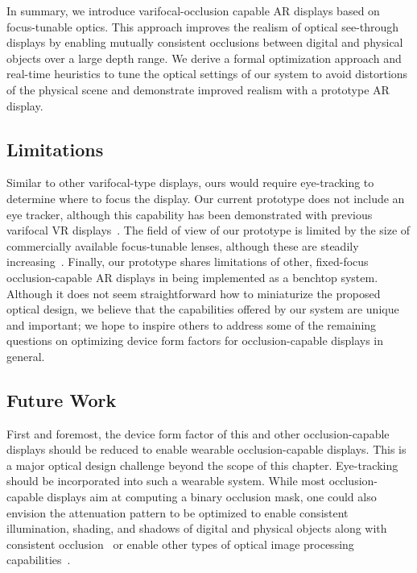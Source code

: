 In summary, we introduce varifocal-occlusion capable AR displays based on focus-tunable optics. This approach improves the realism of optical see-through displays by enabling mutually consistent occlusions between digital and physical objects over a large depth range. We derive a formal optimization approach and real-time heuristics to tune the optical settings of our system to avoid distortions of the physical scene and demonstrate improved realism with a prototype AR display. 

\subsection{Limitations}

Similar to other varifocal-type displays, ours would require eye-tracking to determine where to focus the display. Our current prototype does not include an eye tracker, although this capability has been demonstrated with previous varifocal VR displays~\cite{Padmanaban2016Optimizing}. The field of view of our prototype is limited by the size of commercially available focus-tunable lenses, although these are steadily increasing~\cite{Padmanaban2019Autofocals}. Finally, our prototype shares limitations of other, fixed-focus occlusion-capable AR displays in being implemented as a benchtop system. Although it does not seem straightforward how to miniaturize the proposed optical design, we believe that the capabilities offered by our system are unique and important; we hope to inspire others to address some of the remaining questions on optimizing device form factors for occlusion-capable displays in general. 

\subsection{Future Work}

First and foremost, the device form factor of this and other occlusion-capable displays should be reduced to enable wearable occlusion-capable displays. This is a major optical design challenge beyond the scope of this chapter. Eye-tracking should be incorporated into such a wearable system. While most occlusion-capable displays aim at computing a binary occlusion mask, one could also envision the attenuation pattern to be optimized to enable consistent illumination, shading, and shadows of digital and physical objects along with consistent occlusion~\cite{bimber2003consistent} or enable other types of optical image processing capabilities~\cite{Wetzstein2010}. 

